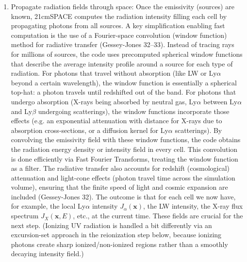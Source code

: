 \documentclass[floats,floatfix,showpacs,amssymb,prd,superscriptaddress,nofootinbib]{revtex4-2} %
\begin{document}
\begin{enumerate}
    \item Propagate radiation fields through space: Once the emissivity (sources) are known, 21cmSPACE computes the radiation intensity filling each cell by propagating photons from all sources. A key simplification enabling fast computation is the use of a Fourier-space convolution (window function) method for radiative transfer (Gessey-Jones 32–33). Instead of tracing rays for millions of sources, the code uses precomputed spherical window functions that describe the average intensity profile around a source for each type of radiation. For photons that travel without absorption (like LW or Ly$\alpha$ beyond a certain wavelength), the window function is essentially a spherical top-hat: a photon travels until redshifted out of the band. For photons that undergo absorption (X-rays being absorbed by neutral gas, Ly$\alpha$ between Ly$\alpha$ and Ly$\beta$ undergoing scatterings), the window functions incorporate those effects (e.g. an exponential attenuation with distance for X-rays due to absorption cross-sections, or a diffusion kernel for Ly$\alpha$ scatterings). By convolving the emissivity field with these window functions, the code obtains the radiation energy density or intensity field in every cell. This convolution is done efficiently via Fast Fourier Transforms, treating the window function as a filter. The radiative transfer also accounts for redshift (cosmological) attenuation and light-cone effects (photon travel time across the simulation volume), ensuring that the finite speed of light and cosmic expansion are included (Gessey-Jones 32). The outcome is that for each cell we now have, for example, the local Ly$\alpha$ intensity $J_{\alpha}(\mathbf{x})$, the LW intensity, the X-ray flux spectrum $J_X(\mathbf{x},E)$, etc., at the current time. These fields are crucial for the next step. (Ionizing UV radiation is handled a bit differently via an excursion-set approach in the reionization step below, because ionizing photons create sharp ionized/non-ionized regions rather than a smoothly decaying intensity field.)


\end{enumerate}
\end{document}
